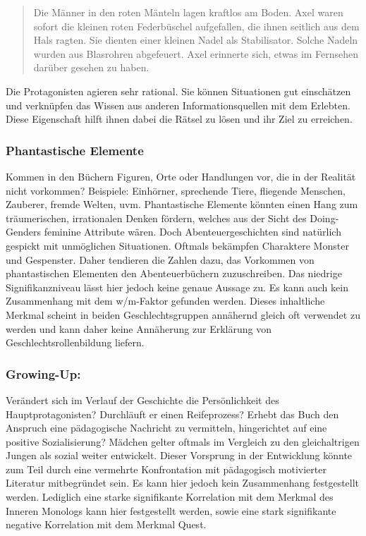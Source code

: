 \begin{quote}
Die Männer in den roten Mänteln lagen kraftlos am Boden. \textelp{} Axel
waren sofort die kleinen roten Federbüschel aufgefallen, die ihnen
seitlich aus dem Hals ragten. Sie dienten einer kleinen Nadel als
Stabilisator. Solche Nadeln wurden aus Blasrohren abgefeuert. Axel
erinnerte sich, etwas im Fernsehen darüber gesehen zu haben.
\parencite[][117]{Brezina2010}
\end{quote}

Die Protagonisten agieren sehr rational. Sie können Situationen gut
einschätzen und verknüpfen das Wissen aus anderen Informationsquellen
mit dem Erlebten. Diese Eigenschaft hilft ihnen dabei die Rätsel zu
lösen und ihr Ziel zu erreichen.

\subsubsection{Phantastische Elemente}

Kommen in den Büchern Figuren, Orte oder Handlungen vor, die in der
Realität nicht vorkommen? Beispiele: Einhörner, sprechende Tiere,
fliegende Menschen, Zauberer, fremde Welten, uvm. Phantastische Elemente
könnten einen Hang zum träumerischen, irrationalen Denken fördern,
welches aus der Sicht des Doing-Genders feminine Attribute wären. Doch
Abenteuergeschichten sind natürlich gespickt mit unmöglichen
Situationen. Oftmals bekämpfen Charaktere Monster und Gespenster. Daher
tendieren die Zahlen dazu, das Vorkommen von phantastischen Elementen
den Abenteuerbüchern zuzuschreiben. Das niedrige Signifikanzniveau lässt
hier jedoch keine genaue Aussage zu. Es kann auch kein Zusammenhang mit
dem w/m-Faktor gefunden werden. Dieses inhaltliche Merkmal scheint in
beiden Geschlechtsgruppen annähernd gleich oft verwendet zu werden und
kann daher keine Annäherung zur Erklärung von Geschlechtsrollenbildung
liefern.

\subsubsection{Growing-Up:}

Verändert sich im Verlauf der Geschichte die Persönlichkeit des
Hauptprotagonisten? Durchläuft er einen Reifeprozess? Erhebt das Buch
den Anspruch eine pädagogische Nachricht zu vermitteln, hingerichtet auf
eine positive Sozialisierung? Mädchen gelter oftmals im Vergleich zu den
gleichaltrigen Jungen als sozial weiter entwickelt. Dieser Vorsprung in
der Entwicklung könnte zum Teil durch eine vermehrte Konfrontation mit
pädagogisch motivierter Literatur mitbegründet sein. Es kann hier jedoch
kein Zusammenhang festgestellt werden. Lediglich eine starke
signifikante Korrelation mit dem Merkmal des Inneren Monologs kann hier
festgestellt werden, sowie eine stark signifikante negative Korrelation
mit dem Merkmal Quest.

